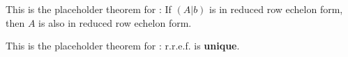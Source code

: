 \begin{additional theorem} \label{athm 3.16}
This is the placeholder theorem for :
If \((A|b)\) is in reduced row echelon form, then \(A\) is also in reduced row echelon form.
\end{additional theorem}

\begin{additional theorem} \label{athm 3.17}
This is the placeholder theorem for :
r.r.e.f. is \textbf{unique}.
\end{additional theorem}
